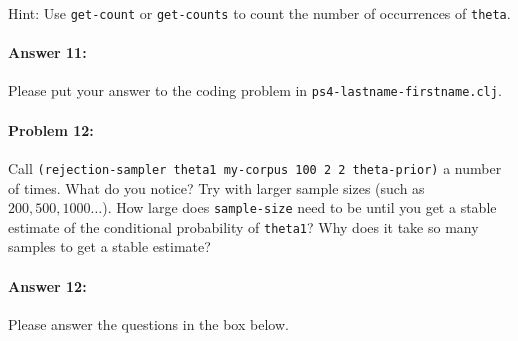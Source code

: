 \documentclass[10pt]{article}
\newcommand{\PSnum}{4}
\begin{document}
\noindent Hint: Use \texttt{get-count} or \texttt{get-counts} to count
the number of occurrences of \texttt{theta}.

\paragraph{Answer 11:} Please put your answer to the coding problem in
\texttt{ps\PSnum-lastname-firstname.clj}.

\noindent\hrulefill %

\paragraph{Problem 12:}

Call \texttt{(rejection-sampler theta1 my-corpus 100 2 2 theta-prior)}
a number of times. What do you notice? Try with larger sample sizes
(such as $200, 500, 1000\ldots$). How large does
\texttt{sample-size} need to be until you get a stable estimate of the
conditional probability of \texttt{theta1}? Why does it take so many
samples to get a stable estimate?

\paragraph{Answer 12:} Please answer the questions in the box below.
\end{document}
